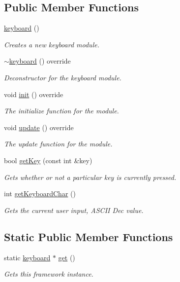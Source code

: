 \subsection*{Public Member Functions}
\begin{DoxyCompactItemize}
\item 
\hyperlink{classflounder_1_1keyboard_a2545f195eb7f57530cdc9056f641702c}{keyboard} ()
\begin{DoxyCompactList}\small\item\em Creates a new keyboard module. \end{DoxyCompactList}\item 
\hyperlink{classflounder_1_1keyboard_ac78be35918c4741e37bc0d35976f5a4a}{$\sim$keyboard} () override
\begin{DoxyCompactList}\small\item\em Deconstructor for the keyboard module. \end{DoxyCompactList}\item 
void \hyperlink{classflounder_1_1keyboard_a624374ba5d79431171a44ed332e63322}{init} () override
\begin{DoxyCompactList}\small\item\em The initialize function for the module. \end{DoxyCompactList}\item 
void \hyperlink{classflounder_1_1keyboard_a9fe79eabe905466fd90413d2c3b68841}{update} () override
\begin{DoxyCompactList}\small\item\em The update function for the module. \end{DoxyCompactList}\item 
bool \hyperlink{classflounder_1_1keyboard_a0138ab3a7770eae57039618cb8d54992}{get\+Key} (const int \&key)
\begin{DoxyCompactList}\small\item\em Gets whether or not a particular key is currently pressed. \end{DoxyCompactList}\item 
int \hyperlink{classflounder_1_1keyboard_ad941be3ae52b1c60437695d8faf1b6d7}{get\+Keyboard\+Char} ()
\begin{DoxyCompactList}\small\item\em Gets the current user input, A\+S\+C\+II Dec value. \end{DoxyCompactList}\end{DoxyCompactItemize}
\subsection*{Static Public Member Functions}
\begin{DoxyCompactItemize}
\item 
static \hyperlink{classflounder_1_1keyboard}{keyboard} $\ast$ \hyperlink{classflounder_1_1keyboard_a7493bf7e18bf4b5fc7679a3e8b10ec27}{get} ()
\begin{DoxyCompactList}\small\item\em Gets this framework instance. \end{DoxyCompactList}\end{DoxyCompactItemize}
